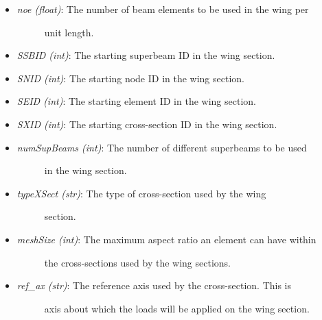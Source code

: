 \documentclass[letterpaper,10pt,english]{sphinxmanual}
\begin{document}
\begin{fulllineitems}
\begin{fulllineitems}
\begin{itemize}
\begin{description}
\end{description}

\item {} \begin{description}
\item[{\emph{noe (float)}: The number of beam elements to be used in the wing per}] \leavevmode
unit length.

\end{description}

\item {} 
\emph{SSBID (int)}: The starting superbeam ID in the wing section.

\item {} 
\emph{SNID (int)}: The starting node ID in the wing section.

\item {} 
\emph{SEID (int)}: The starting element ID in the wing section.

\item {} 
\emph{SXID (int)}: The starting cross-section ID in the wing section.

\item {} \begin{description}
\item[{\emph{numSupBeams (int)}: The number of different superbeams to be used}] \leavevmode
in the wing section.

\end{description}

\item {} \begin{description}
\item[{\emph{typeXSect (str)}: The type of cross-section used by the wing}] \leavevmode
section.

\end{description}

\item {} \begin{description}
\item[{\emph{meshSize (int)}: The maximum aspect ratio an element can have within}] \leavevmode
the cross-sections used by the wing sections.

\end{description}

\item {} \begin{description}
\item[{\emph{ref\_ax (str)}: The reference axis used by the cross-section. This is}] \leavevmode
axis about which the loads will be applied on the wing section.


\end{description}
\end{itemize}
\end{fulllineitems}
\end{fulllineitems}
\end{document}
